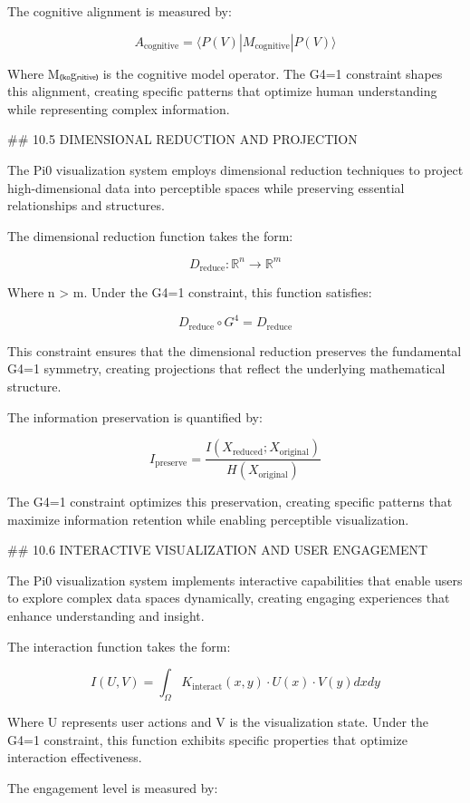 The cognitive alignment is measured by:

$$A_{\text{cognitive}} = \langle P(V) | M_{\text{cognitive}} | P(V) \rangle$$

Where M₍ₖₒgₙᵢₜᵢᵥₑ₎ is the cognitive model operator. The G4=1 constraint shapes this alignment, creating specific patterns that optimize human understanding while representing complex information.

## 10.5 DIMENSIONAL REDUCTION AND PROJECTION

The Pi0 visualization system employs dimensional reduction techniques to project high-dimensional data into perceptible spaces while preserving essential relationships and structures.

The dimensional reduction function takes the form:

$$D_{\text{reduce}}: \mathbb{R}^n \rightarrow \mathbb{R}^m$$

Where n > m. Under the G4=1 constraint, this function satisfies:

$$D_{\text{reduce}} \circ G^4 = D_{\text{reduce}}$$

This constraint ensures that the dimensional reduction preserves the fundamental G4=1 symmetry, creating projections that reflect the underlying mathematical structure.

The information preservation is quantified by:

$$I_{\text{preserve}} = \frac{I(X_{\text{reduced}}; X_{\text{original}})}{H(X_{\text{original}})}$$

The G4=1 constraint optimizes this preservation, creating specific patterns that maximize information retention while enabling perceptible visualization.

## 10.6 INTERACTIVE VISUALIZATION AND USER ENGAGEMENT

The Pi0 visualization system implements interactive capabilities that enable users to explore complex data spaces dynamically, creating engaging experiences that enhance understanding and insight.

The interaction function takes the form:

$$I(U, V) = \int_{\Omega} K_{\text{interact}}(x, y) \cdot U(x) \cdot V(y) dx dy$$

Where U represents user actions and V is the visualization state. Under the G4=1 constraint, this function exhibits specific properties that optimize interaction effectiveness.

The engagement level is measured by:

